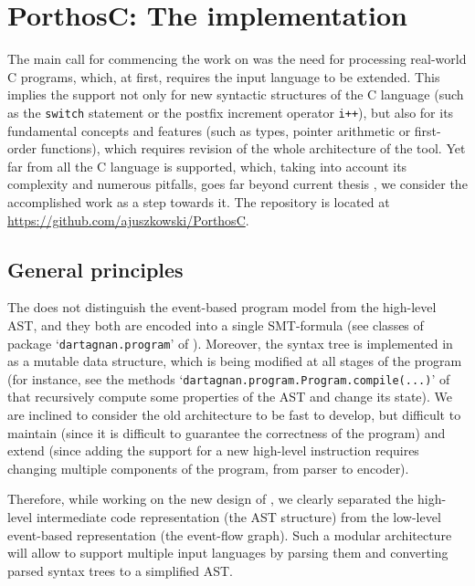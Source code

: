 \chapter{PorthosC: The implementation}
\label{ch:impl}

The main call for commencing the work on \porthos[2] was the need for processing real-world C programs, which, at first, requires the input language to be extended.
This implies the support not only for new syntactic structures of the C language (such as the \texttt{switch} statement or the postfix increment operator \texttt{i++}), but also for its fundamental concepts and features (such as types, pointer arithmetic or first-order functions), which requires revision of the whole architecture of the tool.
Yet far from all the C language is supported, which, taking into account its complexity and numerous pitfalls, goes far beyond current thesis%
%
%
%
, we consider the accomplished work as a step towards it.
The \porthos[2] repository is located at \url{https://github.com/ajuszkowski/PorthosC}.


\section{General principles}
\label{ch:impl:principles}

The \porthos[1] does not distinguish the event-based program model from the high-level AST, and they both are encoded into a single SMT-formula (see classes of package `\texttt{dartagnan.program}' of \porthos[1]).
Moreover, the syntax tree is implemented in \porthos[1] as a mutable data structure, which is being modified at all stages of the program (for instance, see the methods `\texttt{dartagnan.program.Program.compile(...)}' of \porthos[1] that recursively compute some properties of the AST and change its state).
We are inclined to consider the old architecture to be fast to develop, but difficult to maintain (since it is difficult to guarantee the correctness of the program) and extend (since adding the support for a new high-level instruction requires changing multiple components of the program, from parser to encoder).

Therefore, while working on the new design of \porthos[2], we clearly separated the high-level intermediate code representation (the AST structure) from the low-level event-based representation (the event-flow graph).
Such a modular architecture will allow to support multiple input languages%
%
%
by parsing them and converting parsed syntax trees to a simplified AST.

